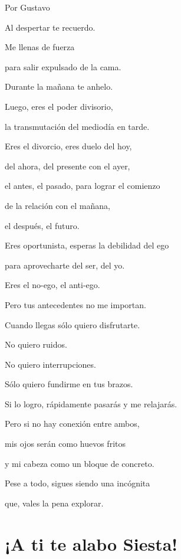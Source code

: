 \documentclass[11pt,twoside,openright,a5paper]{book}
\begin{document}
\begin{flushright}Por Gustavo\end{flushright}


\begin{center}
Al despertar te recuerdo.

Me llenas de fuerza

para salir expulsado de la cama.

Durante la mañana te anhelo.

Luego, eres el poder divisorio, 

la transmutación del mediodía en tarde.

Eres el divorcio, eres duelo del hoy, 

del ahora, del presente con el ayer, 

el antes, el pasado, para lograr el comienzo 

de la relación con el mañana, 

el después, el futuro.

Eres oportunista, esperas la debilidad del ego

para aprovecharte del ser, del yo.

Eres el no-ego, el anti-ego.

Pero tus antecedentes no me importan.

Cuando llegas sólo quiero disfrutarte.

No quiero ruidos.

No quiero interrupciones.

Sólo quiero fundirme en tus brazos.

Si lo logro, rápidamente pasarás y me relajarás.

Pero si no hay conexión entre ambos,

mis ojos serán como huevos fritos 

y mi cabeza como un bloque de concreto.

Pese a todo, sigues siendo una incógnita

que, vales la pena explorar.
\end{center}

\section*{¡A ti te alabo Siesta!}
\end{document}
